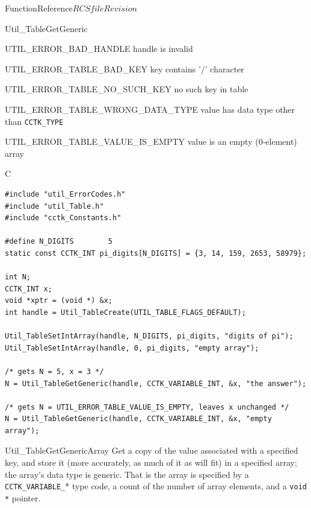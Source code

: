 \begin{cactuspart}{FunctionReference}{$RCSfile$}{$Revision$}
\begin{FunctionDescription}{Util\_TableGetGeneric}
\begin{ErrorSection}
\begin{Error}{UTIL\_ERROR\_BAD\_HANDLE}
handle is invalid
\end{Error}
\begin{Error}{UTIL\_ERROR\_TABLE\_BAD\_KEY}
key contains '/' character
\end{Error}
\begin{Error}{UTIL\_ERROR\_TABLE\_NO\_SUCH\_KEY}
no such key in table
\end{Error}
\begin{Error}{UTIL\_ERROR\_TABLE\_WRONG\_DATA\_TYPE}
value has data type other than \verb|CCTK_TYPE|
\end{Error}
\begin{Error}{UTIL\_ERROR\_TABLE\_VALUE\_IS\_EMPTY}
value is an empty (0-element) array
\end{Error}
\end{ErrorSection}

\begin{ExampleSection}
\begin{Example}{C}
\begin{verbatim}
#include "util_ErrorCodes.h"
#include "util_Table.h"
#include "cctk_Constants.h"

#define N_DIGITS        5
static const CCTK_INT pi_digits[N_DIGITS] = {3, 14, 159, 2653, 58979};

int N;
CCTK_INT x;
void *xptr = (void *) &x;
int handle = Util_TableCreate(UTIL_TABLE_FLAGS_DEFAULT);

Util_TableSetIntArray(handle, N_DIGITS, pi_digits, "digits of pi");
Util_TableSetIntArray(handle, 0, pi_digits, "empty array");

/* gets N = 5, x = 3 */
N = Util_TableGetGeneric(handle, CCTK_VARIABLE_INT, &x, "the answer");

/* gets N = UTIL_ERROR_TABLE_VALUE_IS_EMPTY, leaves x unchanged */
N = Util_TableGetGeneric(handle, CCTK_VARIABLE_INT, &x, "empty array");
\end{verbatim}
\end{Example}
\end{ExampleSection}
\end{FunctionDescription}


\begin{FunctionDescription}{Util\_TableGetGenericArray}
\label{Util-TableGetGenericArray}
Get a copy of the value associated with a specified key, and store
it (more accurately, as much of it as will fit) in a specified array;
the array's data type is generic.  That is the array is specified by
a \verb|CCTK_VARIABLE_|* type code, a count of the number of array
elements, and a \verb|void *| pointer.


\end{FunctionDescription}
\end{cactuspart}
